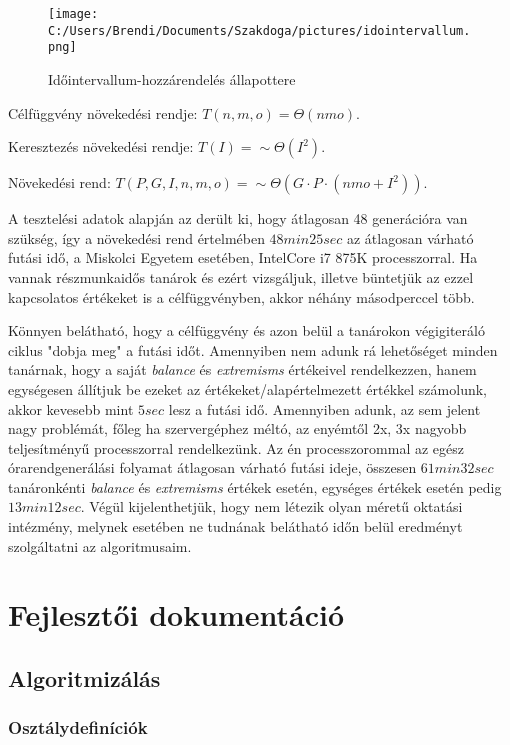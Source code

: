 \documentclass[a4paper,12pt]{article}
\begin{document}
\begin{figure}
\texttt{[image: C:/Users/Brendi/Documents/Szakdoga/pictures/idointervallum.png]}
\caption{Időintervallum-hozzárendelés állapottere}
\end{figure}

Célfüggvény növekedési rendje: $T(n,m,o)=\Theta(nmo)$.

Keresztezés növekedési rendje: $T(I)=\sim \Theta(I^2)$.

Növekedési rend: $T(P,G,I,n,m,o)=\sim \Theta(G \cdot P \cdot (nmo+I^2))$.

A tesztelési adatok alapján az derült ki, hogy átlagosan 48 generációra van szükség, így a növekedési rend értelmében $48min 25sec$ az átlagosan várható futási idő, a Miskolci Egyetem esetében, IntelCore i7 875K processzorral. Ha vannak részmunkaidős tanárok és ezért vizsgáljuk, illetve büntetjük az ezzel kapcsolatos értékeket is a célfüggvényben, akkor néhány másodperccel több.

Könnyen belátható, hogy a célfüggvény és azon belül a tanárokon végigiteráló ciklus "dobja meg" a futási időt. Amennyiben nem adunk rá lehetőséget minden tanárnak, hogy a saját \textsl{balance} és \textsl{extremisms} értékeivel rendelkezzen, hanem egységesen állítjuk be ezeket az értékeket/alapértelmezett értékkel számolunk, akkor kevesebb mint $5 sec$ lesz a futási idő. Amennyiben adunk, az sem jelent nagy problémát, főleg ha szervergéphez méltó, az enyémtől 2x, 3x nagyobb teljesítményű processzorral rendelkezünk. Az én processzorommal az egész órarendgenerálási folyamat átlagosan várható futási ideje, összesen $61min 32sec$ tanáronkénti \textsl{balance} és \textsl{extremisms} értékek esetén, egységes értékek esetén pedig $13min 12sec$. Végül kijelenthetjük, hogy nem létezik olyan méretű oktatási intézmény, melynek esetében ne tudnának belátható időn belül eredményt szolgáltatni az algoritmusaim.

\section{Fejlesztői dokumentáció}

\subsection{Algoritmizálás}

\subsubsection{Osztálydefiníciók}
\end{document}
